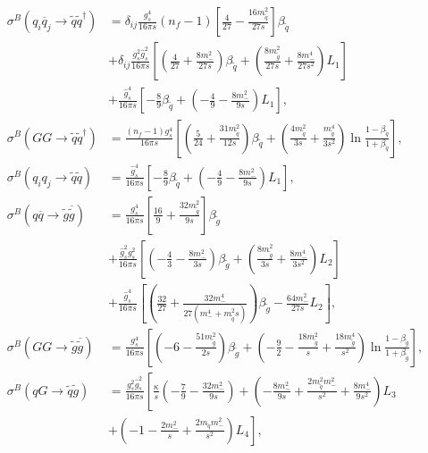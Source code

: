 \begin{align}
\sigma^B(q_i \overline{q}_j \to \tilde{q}\tilde{q}^\dagger) &= \delta_{ij}  \frac{g_s^4}{16\pi s} (n_f-1) \left[ \frac{4}{27} - \frac{16 m_{\tilde{q}}^2}{27s} \right]\beta_{\tilde{q}}\nonumber\\
&+ \delta_{ij} \frac{g_s^2\hat{g}_s^2}{16\pi s}  \left[ \left( \frac{4}{27} + \frac{8 m_-^2}{27 s} \right)\beta_{\tilde{q}}  + \left( \frac{8m_{\tilde{g}}^2}{27s} + \frac{8m_-^4}{27s^2} \right)L_1 \right]\nonumber\\
& + \frac{\hat{g}_s^4}{16\pi s} \left[ -\frac{8}{9}\beta_{\tilde{q}} + \left( -\frac{4}{9} - \frac{8m_-^2}{9s} \right)L_1 \right],\\
\sigma^B(GG \to \tilde{q}\tilde{q}^\dagger) &= \frac{(n_f-1) g_s^4}{16\pi s} \left[ \left(\frac{5}{24} + \frac{31 m_{\tilde{q}}^2}{12s}\right)\beta_{\tilde{q}} + \left( \frac{4m_{\tilde{q}}^2}{3s} + \frac{m_{\tilde{q}}^4}{3s^2} \right) \ln \frac{1-\beta_{\tilde{q}}}{1+\beta_{\tilde{q}}} \right],\\
\sigma^B(q_i q_j \to \tilde{q}\tilde{q}) &= \frac{\hat{g}_s^4}{16\pi s} \left[ -\frac{8}{9}\beta_{\tilde{q}} +  \left( -\frac{4}{9} - \frac{8m_-^2}{9s} \right)L_1 \right],\\
\sigma^B(q \overline{q} \to \tilde{g}\overline{\tilde{g}}) &= \frac{g_s^4}{16\pi s} \left[ \frac{16}{9} + \frac{32m_{\tilde{g}}^2}{9s} \right] \beta_{\tilde{g}}\nonumber\\
& + \frac{\hat{g}_s^2 g_s^2}{16\pi s}  \left[ \left( -\frac{4}{3}-\frac{8m_-^2}{3s} \right)\beta_{\tilde{g}} + \left( \frac{8 m_{\tilde{g}}^2}{3s} + \frac{8m_-^4}{3s^2} \right) L_2 \right]\nonumber\\
& + \frac{\hat{g}_s^4}{16\pi s} \left[ \left( \frac{32}{27} + \frac{32 m_-^4}{27(m_-^4 + m_{\tilde{q}}^2s)} \right)\beta_{\tilde{g}} - \frac{64m_-^2}{27s}L_2 \right],\label{eq:qqbar_to_sgsgbar}\\
\sigma^B(GG \to \tilde{g}\overline{\tilde{g}}) &= \frac{g_s^4}{16\pi s} \left[ \left( -6 - \frac{51 m_{\tilde{g}}^2}{2s} \right)\beta_{\tilde{g}} + \left( -\frac{9}{2} - \frac{18 m_{\tilde{g}}^2}{s} + \frac{18 m_{\tilde{g}}^4}{s^2} \right)\ln \frac{1-\beta_{\tilde{g}}}{1+\beta_{\tilde{g}}} \right],\\
\sigma^B(q G \to \tilde{q} \tilde{g}) &= \frac{g_s^2\hat{g}_s^2}{16\pi s} \left[ \frac{\kappa}{s}\left( -\frac{7}{9} - \frac{32 m_{-}^2}{9s} \right) + \left( -\frac{8m_-^2}{9s} + \frac{2m_{\tilde{q}}^2m_-^2}{s^2} + \frac{8 m_-^4}{9s^2} \right)L_3\right.\nonumber\\
&+\left. \left( -1-\frac{2m_-^2}{s} + \frac{2m_{\tilde{q}}m_-^2}{s^2} \right)L_4 \right],
\end{align}
